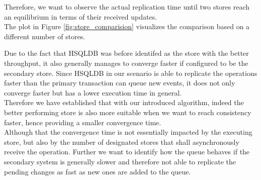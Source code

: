 Therefore, we want to observe the actual replication time until two stores reach an equilibrium in terms of their received updates.\\
The plot in Figure \ref{fig:store_comparision} visualizes the comparison based on a different number of stores.

Due to the fact that HSQLDB was before identifed as the store with the better throughput, 
it also generally manages to converge faster if configured to be the secondary store. 
Since HSQLDB in our scenario is able to replicate the operations faster than the primary transaction can queue new events,
it does not only converge faster but has a lower execution time in general.\\
Therefore we have established that with our introduced algorithm, indeed
the better performing store is also more suitable when we want to reach consistency faster, hence providing a smaller convergence time.\\




Although that the convergence time is not essentially impacted by the executing store, but also by the number of designated stores that shall asynchronously 
receive the operation. 
Further we want to identify how the queue behaves if the secondary system is generally slower and therefore not able to replicate 
the pending changes as fast as new ones are added to the queue.



